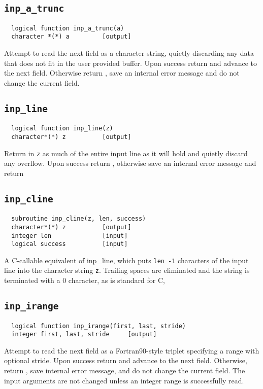 \subsection{{\tt inp\_a\_trunc}}
\begin{verbatim}
  logical function inp_a_trunc(a)
  character *(*) a         [output]
\end{verbatim}
Attempt to read the next field as a character string, quietly
discarding any data that does not fit in the user provided buffer.
Upon success return \TRUE and advance to the next field.
Otherwise return \FALSE, save an internal error message and do
not change the current field.

\subsection{{\tt inp\_line}}
\begin{verbatim}
  logical function inp_line(z)
  character*(*) z          [output]
\end{verbatim}
Return in {\tt z} as much of the entire input line as it will hold and
quietly discard any overflow.  Upon success return \TRUE,
otherwise save an internal error message and return \FALSE

\subsection{{\tt inp\_cline}}
\begin{verbatim}
  subroutine inp_cline(z, len, success)
  character*(*) z          [output]
  integer len              [input]
  logical success          [input]
\end{verbatim}
A C-callable equivalent of inp\_line, which puts {\tt len -1} characters of
the input line into the character string {\tt z}. Trailing spaces are
eliminated and the string is terminated with a 0 character, as is
standard for C,


\subsection{{\tt inp\_irange}}
\begin{verbatim}
  logical function inp_irange(first, last, stride)
  integer first, last, stride     [output]
\end{verbatim}
Attempt to read the next field as a Fortran90-style triplet specifying
a range with optional stride.  Upon success return \TRUE and
advance to the next field.  Otherwise, return \FALSE, save
internal error message, and do not change the current field.  The
input arguments are not changed unless an integer range is
successfully read.

